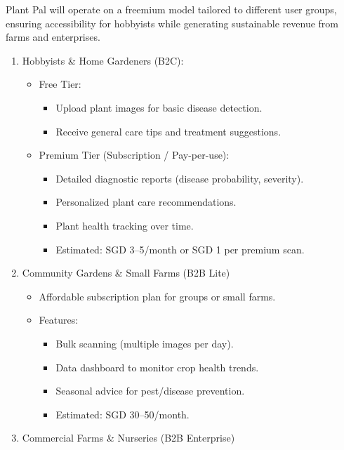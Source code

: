 \documentclass[11pt]{article}
\begin{document}
Plant Pal will operate on a freemium model tailored to different user groups, ensuring accessibility for hobbyists while generating sustainable revenue from farms and enterprises.

\begin{enumerate}
    \item Hobbyists \& Home Gardeners (B2C):
    \begin{itemize}
        \item Free Tier:
        \begin{itemize}
            \item Upload plant images for basic disease detection.
            \item 
            Receive general care tips and treatment suggestions.
        \end{itemize}
        \item Premium Tier (Subscription / Pay-per-use):
        \begin{itemize}
            \item Detailed diagnostic reports (disease probability, severity).
            \item Personalized plant care recommendations.
            \item Plant health tracking over time.
            \item Estimated: SGD 3–5/month or SGD 1 per premium scan.
        \end{itemize}
    \end{itemize}
    \item Community Gardens \& Small Farms (B2B Lite)
    \begin{itemize}
        \item Affordable subscription plan for groups or small farms.
        \item Features:
        \begin{itemize}
            \item Bulk scanning (multiple images per day).
            \item Data dashboard to monitor crop health trends.
            \item Seasonal advice for pest/disease prevention.
            \item Estimated: SGD 30–50/month.
        \end{itemize}
    \end{itemize}
    \item Commercial Farms \& Nurseries (B2B Enterprise)
    \begin{itemize}

\end{itemize}
\end{enumerate}
\end{document}
